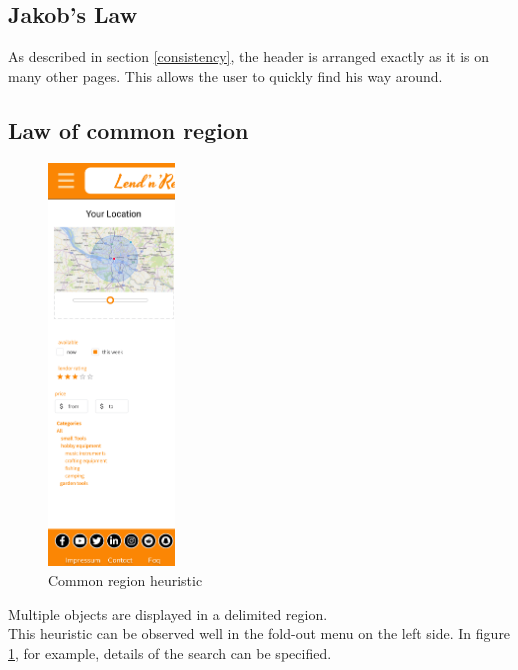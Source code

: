 \subsection{Jakob's Law}
As described in section \ref{consistency}, the header is arranged exactly as it is on many other pages. This allows the user to quickly find his way around.

\subsection{Law of common region}
	\begin{figure}
	\includegraphics[width=0.3\textwidth]{abb/1_usability_guidelines/heuristic_region.png}
	\caption{Common region heuristic}
	\label{fig:heuristic_common_region}
\end{figure}
Multiple objects are displayed in a delimited region. \\
This heuristic can be observed well in the fold-out menu on the left side. In figure \ref{fig:heuristic_common_region}, for example, details of the search can be specified.



